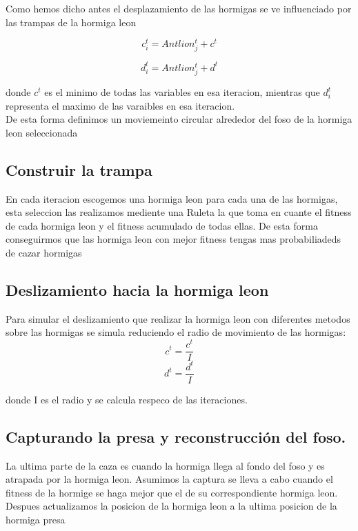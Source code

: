   Como hemos dicho antes el desplazamiento de las hormigas se ve influenciado por las trampas de la hormiga leon

  \begin{equation}
    c_i^t = Antlion_j^t +c^t 
  \end{equation}

  \begin{equation}
    d_i^t = Antlion_j^t +d^t
  \end{equation}

  donde $c^t$ es el minimo de todas las variables en esa iteracion, mientras que $d_i^t$ representa el maximo 
  de las varaibles en esa iteracion.\\
  De esta forma definimos un moviemeinto circular alrededor del foso de la hormiga leon seleccionada

  \subsection{Construir la trampa}

  En cada iteracion escogemos una hormiga leon para cada una de las hormigas, esta seleccion las realizamos mediente una 
  Ruleta la que toma en cuante el fitness de cada hormiga leon y el fitness acumulado de todas ellas. 
  De esta forma conseguirmos que las hormiga leon con mejor fitness tengas mas probabiliadeds de cazar hormigas

  \subsection{Deslizamiento hacia la hormiga leon}
   Para simular el deslizamiento que realizar la hormiga leon con diferentes metodos sobre las hormigas se simula reduciendo el radio
   de movimiento de las hormigas:\\

   \begin{equation}
    c^t = \frac{c^t}{I}
  \end{equation}
  \begin{equation}
    d^t = \frac{d^t}{I}
  \end{equation}

  donde I es el radio y se calcula respeco de las iteraciones.

  \subsection{Capturando la presa y reconstrucción del foso.}
  La ultima parte de la caza es cuando la hormiga llega al fondo del foso y es atrapada por la hormiga leon.
  Asumimos la captura se lleva a cabo cuando el fitness de la hormige se haga mejor que el de su correspondiente hormiga leon.\\
  Despues actualizamos la posicion de la hormiga leon a la ultima posicion de la hormiga presa

